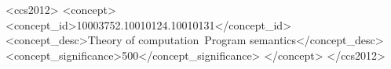 \documentclass[acmsmall,manuscript,screen,review,anonymous]{acmart}
\begin{document}
\begin{CCSXML}
<ccs2012>
  <concept>
    <concept_id>10003752.10010124.10010131</concept_id>
    <concept_desc>Theory of computation~Program semantics</concept_desc>
    <concept_significance>500</concept_significance>
  </concept>
</ccs2012>
\end{CCSXML}
  



\maketitle






% 
% 








% 
\end{document}
